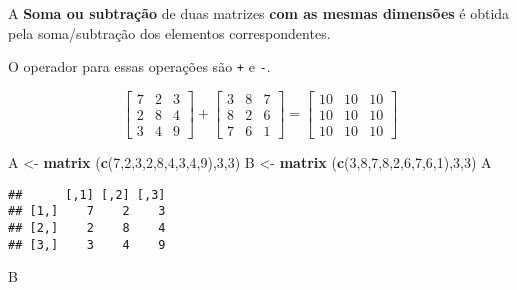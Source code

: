 \documentclass[
]{book}
\newenvironment{Shaded}{\begin{snugshade}}{\end{snugshade}}
\newcommand{\DecValTok}[1]{\textcolor[rgb]{0.00,0.00,0.81}{#1}}
\newcommand{\KeywordTok}[1]{\textcolor[rgb]{0.13,0.29,0.53}{\textbf{#1}}}
\newcommand{\NormalTok}[1]{#1}
\newcommand{\StringTok}[1]{\textcolor[rgb]{0.31,0.60,0.02}{#1}}
\begin{document}
A \textbf{Soma ou subtração} de duas matrizes \textbf{com as mesmas dimensões} é obtida pela soma/subtração dos elementos correspondentes.

O operador para essas operações são \texttt{+} e \texttt{-}.

\begin{equation*}
\begin{bmatrix}
7 & 2 & 3\\
2 & 8 & 4\\
3 & 4 & 9
\end{bmatrix} + 
\begin{bmatrix}
3 & 8 & 7\\
8 & 2 & 6\\
7 & 6 & 1
\end{bmatrix} = 
\begin{bmatrix}
10 & 10 & 10\\
10 & 10 & 10\\
10 & 10 & 10
\end{bmatrix}
\end{equation*}

\begin{Shaded}
\begin{Highlighting}[]
\NormalTok{A \textless{}{-}}\StringTok{ }\KeywordTok{matrix}\NormalTok{ (}\KeywordTok{c}\NormalTok{(}\DecValTok{7}\NormalTok{,}\DecValTok{2}\NormalTok{,}\DecValTok{3}\NormalTok{,}\DecValTok{2}\NormalTok{,}\DecValTok{8}\NormalTok{,}\DecValTok{4}\NormalTok{,}\DecValTok{3}\NormalTok{,}\DecValTok{4}\NormalTok{,}\DecValTok{9}\NormalTok{),}\DecValTok{3}\NormalTok{,}\DecValTok{3}\NormalTok{)}
\NormalTok{B \textless{}{-}}\StringTok{ }\KeywordTok{matrix}\NormalTok{ (}\KeywordTok{c}\NormalTok{(}\DecValTok{3}\NormalTok{,}\DecValTok{8}\NormalTok{,}\DecValTok{7}\NormalTok{,}\DecValTok{8}\NormalTok{,}\DecValTok{2}\NormalTok{,}\DecValTok{6}\NormalTok{,}\DecValTok{7}\NormalTok{,}\DecValTok{6}\NormalTok{,}\DecValTok{1}\NormalTok{),}\DecValTok{3}\NormalTok{,}\DecValTok{3}\NormalTok{)}
\NormalTok{A}
\end{Highlighting}
\end{Shaded}

\begin{verbatim}
##      [,1] [,2] [,3]
## [1,]    7    2    3
## [2,]    2    8    4
## [3,]    3    4    9
\end{verbatim}

\begin{Shaded}
\begin{Highlighting}[]
\NormalTok{B}
\end{Highlighting}
\end{Shaded}
\end{document}
